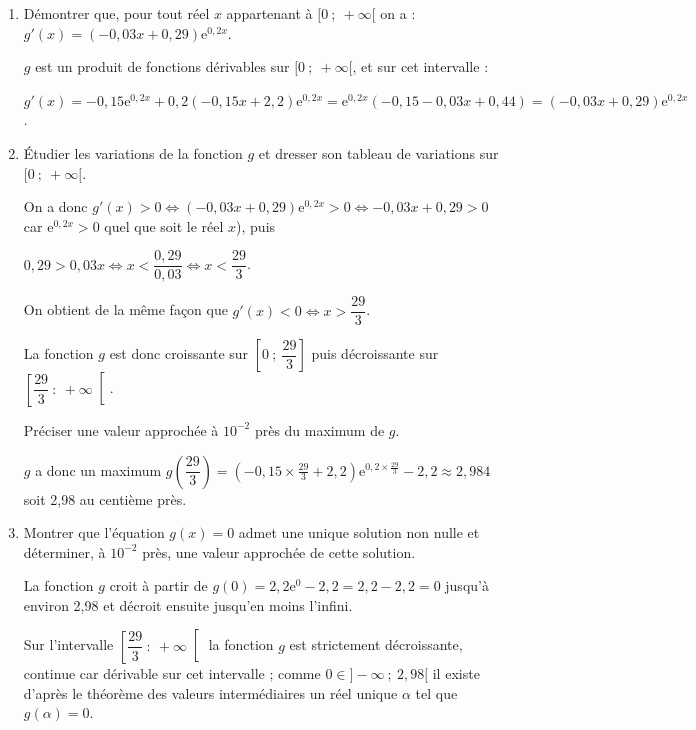 \documentclass[10pt]{article}
\begin{document}
\begin{enumerate}
\begin{enumerate}
On a $\displaystyle\lim_{x \to + \infty} (2,2 - 1,5x) = - \infty$ ; d'autre part $\displaystyle\lim_{x \to + \infty} 2x = + \infty$ et $\displaystyle\lim_{x \to + \infty} \text{e}^{2x} = + \infty$.

Par produit de limites $\displaystyle\lim_{x \to + \infty} = - \infty$.
		\item Démontrer que, pour tout réel $x$ appartenant à $[0~;~+\infty[$ on a : $g'(x) = (- 0,03x + 0,29)\text{e}^{0,2x}$.
		
$g$ est un produit de fonctions dérivables sur $[0~;~+ \infty[$, et sur cet intervalle :
		
$g'(x) = - 0,15 \text{e}^{0,2x} + 0,2(-0,15x + 2,2)\text{e}^{0,2x} = \text{e}^{0,2x}(- 0,15 - 0,03x + 0,44) = (- 0,03x + 0,29)\text{e}^{0,2x}$.
		\item Étudier les variations de la fonction $g$ et dresser son tableau de variations sur $[0~;~+\infty[$.
		
On a donc $g'(x) > 0 \iff (- 0,03x + 0,29)\text{e}^{0,2x} > 0 \iff - 0,03x + 0,29 > 0$ car $\text{e}^{0,2x} > 0$ quel que soit le réel $x$), puis 

$0,29 > 0,03x \iff x < \dfrac{0,29}{0,03} \iff x < \dfrac{29}{3}$.

On obtient de la même façon que $g'(x) < 0 \iff x > \dfrac{29}{3}$.

La fonction $g$ est donc croissante sur $\left[0~;~\dfrac{29}{3}\right]$ puis décroissante sur $\left[\dfrac{29}{3}~:~+ \infty\right[$.

Préciser une valeur approchée à $10^{-2}$ près du maximum de $g$.

$g$ a donc un maximum $g\left(\dfrac{29}{3}\right) = (-0,15\times \frac{29}{3} + 2,2)\text{e}^{0,2\times \frac{29}{3}} - 2,2 \approx 2,984$ soit 2,98 au centième près.
		\item Montrer que l'équation $g(x) = 0$ admet une unique solution non nulle et déterminer, à $10^{-2}$ près, une valeur approchée de cette solution.
		
La fonction $g$ croit à partir de $g(0) = 2,2\text{e}^0 - 2,2 = 2,2 - 2,2 = 0$ jusqu'à environ 2,98 et décroit ensuite jusqu'en moins l'infini.

Sur l'intervalle $\left[\dfrac{29}{3}~:~+ \infty\right[$ la fonction $g$ est strictement décroissante, continue car dérivable sur cet intervalle  ; comme $0 \in ]- \infty~;~2,98[$ il existe d'après le théorème des valeurs intermédiaires un réel unique $\alpha$ tel que $g(\alpha) = 0$.
	\end{enumerate}
\end{enumerate}
\end{document}
